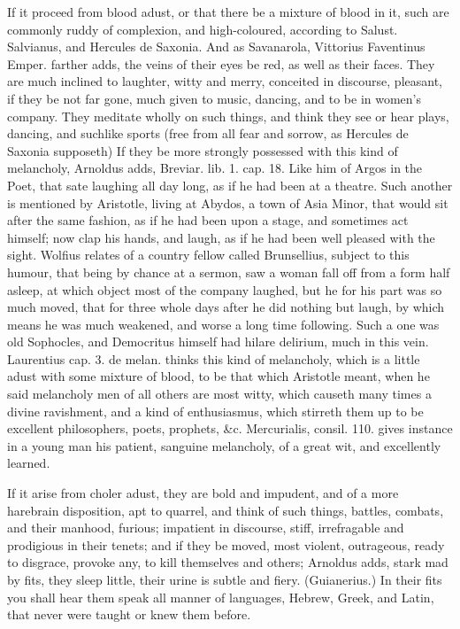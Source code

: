 {If it proceed from blood adust, or that there be a mixture of blood in
it, such are commonly ruddy of complexion, and high-coloured,
according to Salust. Salvianus, and Hercules de Saxonia. And as
Savanarola, Vittorius Faventinus Emper. farther adds, the veins
of their eyes be red, as well as their faces. They are much inclined to
laughter, witty and merry, conceited in discourse, pleasant, if they be
not far gone, much given to music, dancing, and to be in women's
company. They meditate wholly on such things, and think they see
or hear plays, dancing, and suchlike sports (free from all fear and
sorrow, as Hercules de Saxonia supposeth) If they be more
strongly possessed with this kind of melancholy, Arnoldus adds,
Breviar. lib. 1. cap. 18. Like him of Argos in the Poet, that sate
laughing all day long, as if he had been at a theatre. Such
another is mentioned by Aristotle, living at Abydos, a town of
Asia Minor, that would sit after the same fashion, as if he had been
upon a stage, and sometimes act himself; now clap his hands, and laugh,
as if he had been well pleased with the sight. Wolfius relates of a
country fellow called Brunsellius, subject to this humour, that
being by chance at a sermon, saw a woman fall off from a form half
asleep, at which object most of the company laughed, but he for his
part was so much moved, that for three whole days after he did nothing
but laugh, by which means he was much weakened, and worse a long time
following. Such a one was old Sophocles, and Democritus himself had
hilare delirium, much in this vein. Laurentius cap. 3. de melan. thinks
this kind of melancholy, which is a little adust with some mixture of
blood, to be that which Aristotle meant, when he said melancholy men of
all others are most witty, which causeth many times a divine
ravishment, and a kind of enthusiasmus, which stirreth them up to be
excellent philosophers, poets, prophets, \&c. Mercurialis, consil. 110.
gives instance in a young man his patient, sanguine melancholy,
of a great wit, and excellently learned.

If it arise from choler adust, they are bold and impudent, and of a
more harebrain disposition, apt to quarrel, and think of such things,
battles, combats, and their manhood, furious; impatient in discourse,
stiff, irrefragable and prodigious in their tenets; and if they be
moved, most violent, outrageous, ready to disgrace, provoke any,
to kill themselves and others; Arnoldus adds, stark mad by fits,
they sleep little, their urine is subtle and fiery. (Guianerius.)
In their fits you shall hear them speak all manner of languages,
Hebrew, Greek, and Latin, that never were taught or knew them before.

}
